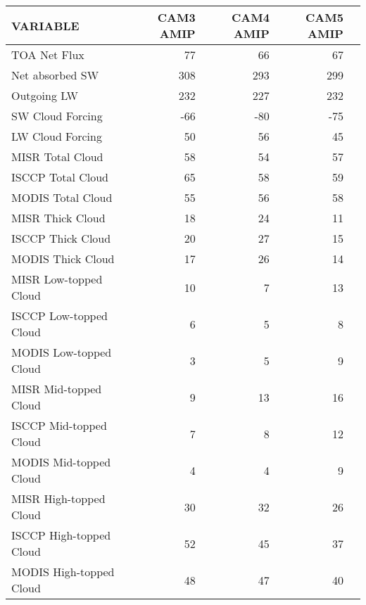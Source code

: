 \begin{tabular}{lrrrr}
\hline
                VARIABLE &                CAM3 AMIP &                CAM4 AMIP &                CAM5 AMIP \\ \hline
            TOA Net Flux &                       77 &                       66 &                       67 \\
         Net absorbed SW &                      308 &                      293 &                      299 \\
             Outgoing LW &                      232 &                      227 &                      232 \\
        SW Cloud Forcing &                      -66 &                      -80 &                      -75 \\
        LW Cloud Forcing &                       50 &                       56 &                       45 \\
        MISR Total Cloud &                       58 &                       54 &                       57 \\
       ISCCP Total Cloud &                       65 &                       58 &                       59 \\
       MODIS Total Cloud &                       55 &                       56 &                       58 \\
        MISR Thick Cloud &                       18 &                       24 &                       11 \\
       ISCCP Thick Cloud &                       20 &                       27 &                       15 \\
       MODIS Thick Cloud &                       17 &                       26 &                       14 \\
   MISR Low-topped Cloud &                       10 &                        7 &                       13 \\
  ISCCP Low-topped Cloud &                        6 &                        5 &                        8 \\
  MODIS Low-topped Cloud &                        3 &                        5 &                        9 \\
   MISR Mid-topped Cloud &                        9 &                       13 &                       16 \\
  ISCCP Mid-topped Cloud &                        7 &                        8 &                       12 \\
  MODIS Mid-topped Cloud &                        4 &                        4 &                        9 \\
  MISR High-topped Cloud &                       30 &                       32 &                       26 \\
 ISCCP High-topped Cloud &                       52 &                       45 &                       37 \\
 MODIS High-topped Cloud &                       48 &                       47 &                       40 \\ \hline
\end{tabular}
